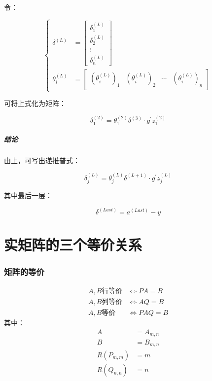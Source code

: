 \documentclass{article}
\begin{document}
令：

\[\left\{\begin{aligned}
        \delta^{\left(L\right)}   & =\begin{bmatrix}\delta_1^{\left(L\right)}\\\delta_2^{\left(L\right)}\\\vdots\\\delta_n^{\left(L\right)}\end{bmatrix} \\
        \theta_i^{\left(L\right)} & =\begin{bmatrix}
                                         \left(\theta_i^{\left(L\right)}\right)_1 &
                                         \left(\theta_i^{\left(L\right)}\right)_2 &
                                         \cdots                                   &
                                         \left(\theta_i^{\left(L\right)}\right)_n
                                     \end{bmatrix}\end{aligned}\right.\]

可将上式化为矩阵：

\[\delta_1^{\left(2\right)}
    =\theta_1^{\left(2\right)}\delta^{\left(3\right)}
    \cdot g^\prime z_1^{\left(2\right)}\]

\subsubsection{结论}

由上，可写出递推普式：

\[\delta_j^{\left(L\right)}
    =\theta_j^{\left(L\right)}\delta^{\left(L+1\right)}\cdot g^\prime z_j^{\left(L\right)}\]

其中最后一层：

\[\delta^{\left(Last\right)}=a^{\left(Last\right)}-y\]

\newpage
\part{实矩阵的三个等价关系}

\section{矩阵的等价}

\begin{definition}
    \[\begin{aligned}
            A,B\text{行等价} & \iff PA=B  \\
            A,B\text{列等价} & \iff AQ=B  \\
            A,B\text{等价}   & \iff PAQ=B
        \end{aligned}\]    其中：
    \[\begin{aligned}
            A                     & =A_{m,n} \\
            B                     & =B_{m,n} \\
            R\left(P_{m,m}\right) & =m       \\
            R\left(Q_{n,n}\right) & =n
        \end{aligned}\]\end{definition}
\end{document}
